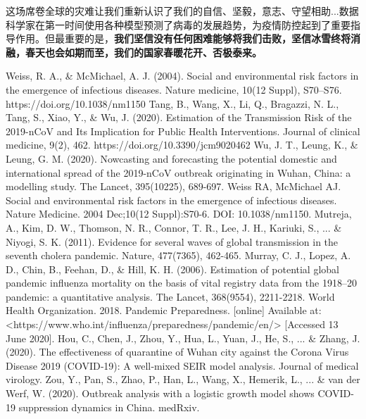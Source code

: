 \documentclass[a4paper, 11pt,twoside=true,UTF8]{scrartcl}
\begin{document}
这场席卷全球的灾难让我们重新认识了我们的自信、坚毅，意志、守望相助...数据科学家在第一时间使用各种模型预测了病毒的发展趋势，为疫情防控起到了重要指导作用。但最重要的是，\textbf{我们坚信没有任何困难能够将我们击败，坚信冰雪终将消融，春天也会如期而至，我们的国家春暖花开、否极泰来。}

\newpage
\begin{thebibliography}{99}
	Weiss, R. A., \& McMichael, A. J. (2004). Social and environmental risk factors in the emergence of infectious diseases. Nature medicine, 10(12 Suppl), S70–S76. https://doi.org/10.1038/nm1150
	Tang, B., Wang, X., Li, Q., Bragazzi, N. L., Tang, S., Xiao, Y., \& Wu, J. (2020). Estimation of the Transmission Risk of the 2019-nCoV and Its Implication for Public Health Interventions. Journal of clinical medicine, 9(2), 462. https://doi.org/10.3390/jcm9020462
	Wu, J. T., Leung, K., \& Leung, G. M. (2020). Nowcasting and forecasting the potential domestic and international spread of the 2019-nCoV outbreak originating in Wuhan, China: a modelling study. The Lancet, 395(10225), 689-697.
	Weiss RA, McMichael AJ. Social and environmental risk factors in the emergence of infectious diseases. Nature Medicine. 2004 Dec;10(12 Suppl):S70-6. DOI: 10.1038/nm1150.
	Mutreja, A., Kim, D. W., Thomson, N. R., Connor, T. R., Lee, J. H., Kariuki, S., ... \& Niyogi, S. K. (2011). Evidence for several waves of global transmission in the seventh cholera pandemic. Nature, 477(7365), 462-465.
	Murray, C. J., Lopez, A. D., Chin, B., Feehan, D., \& Hill, K. H. (2006). Estimation of potential global pandemic influenza mortality on the basis of vital registry data from the 1918–20 pandemic: a quantitative analysis. The Lancet, 368(9554), 2211-2218.
	World Health Organization. 2018. Pandemic Preparedness. [online] Available at: <https://www.who.int/influenza/preparedness/pandemic/en/> [Accessed 13 June 2020].
	Hou, C., Chen, J., Zhou, Y., Hua, L., Yuan, J., He, S., ... \& Zhang, J. (2020). The effectiveness of quarantine of Wuhan city against the Corona Virus Disease 2019 (COVID‐19): A well‐mixed SEIR model analysis. Journal of medical virology.
	Zou, Y., Pan, S., Zhao, P., Han, L., Wang, X., Hemerik, L., ... \& van der Werf, W. (2020). Outbreak analysis with a logistic growth model shows COVID-19 suppression dynamics in China. medRxiv.

\end{thebibliography}
\end{document}
